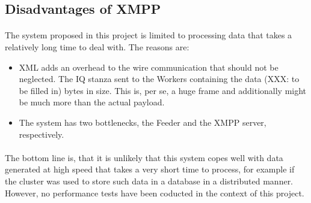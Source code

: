 \subsection{Disadvantages of XMPP}
\paragraph{}
The system proposed in this project is limited to processing data that takes a relatively long time to deal with. The reasons are:
\begin{itemize}
\item XML adds an overhead to the wire communication that should not be neglected. The IQ stanza sent to the Workers containing the data (XXX: to be filled in) bytes in size. This is, per se, a huge frame and additionally might be much more than the actual payload.
\item The system has two bottlenecks, the Feeder and the XMPP server, respectively.
\end{itemize}

\paragraph{}
The bottom line is, that it is unlikely that this system copes well with data generated at high speed that takes a very short time to process, for example if the cluster was used to store such data in a database in a distributed manner. However, no performance tests have been coducted in the context of this project.
